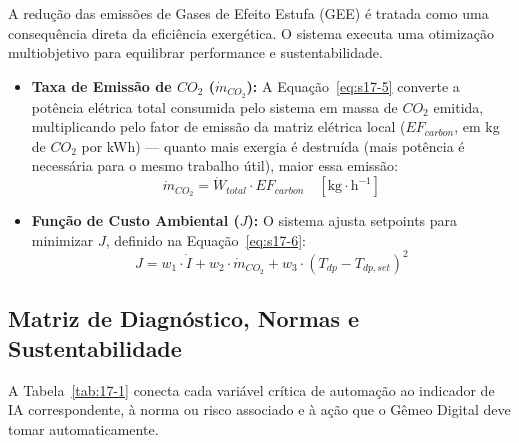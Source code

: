 \documentclass[12pt,a4paper]{article}
\numberwithin{equation}{section}
\numberwithin{table}{section}
\numberwithin{figure}{section}
\begin{document}
{A redução das emissões de Gases de Efeito Estufa (GEE) é tratada como uma consequência direta da eficiência exergética. O sistema executa uma otimização multiobjetivo para equilibrar performance e sustentabilidade.

\begin{itemize}
	\item \textbf{Taxa de Emissão de $CO_2$ ($\dot{m}_{CO_2}$):} A Equação~\eqref{eq:s17-5} converte a potência elétrica total consumida pelo sistema em massa de $CO_2$ emitida, multiplicando pelo fator de emissão da matriz elétrica local ($EF_{carbon}$, em kg de $CO_2$ por kWh) — quanto mais exergia é destruída (mais potência é necessária para o mesmo trabalho útil), maior essa emissão:
	\begin{equation}\label{eq:s17-5}
\dot{m}_{CO_2} = \dot{W}_{total} \cdotp EF_{carbon} \quad [\text{kg} \cdotp \text{h}^{-1}]
\end{equation}
	
	\item \textbf{Função de Custo Ambiental ($J$):}
	O sistema ajusta setpoints para minimizar $J$, definido na Equação~\eqref{eq:s17-6}:
	\begin{equation}\label{eq:s17-6}
J = w_1 \cdotp \dot{I} + w_2 \cdotp \dot{m}_{CO_2} + w_3 \cdotp (T_{dp} - T_{dp,set})^2
\end{equation}
\end{itemize}

\subsection{Matriz de Diagnóstico, Normas e Sustentabilidade}

A Tabela~\ref{tab:17-1} conecta cada variável crítica de automação ao indicador de IA correspondente, à norma ou risco associado e à ação que o Gêmeo Digital deve tomar automaticamente.
\begin{table}[h!tbp]
\centering
\noindent{}
\caption[Matriz de diagnóstico e sustentabilidade do Gêmeo Digital]{Matriz de diagnóstico, normas associadas e ações de sustentabilidade do Gêmeo Digital.}
\label{tab:17-1}
\end{table}

}
\end{document}
